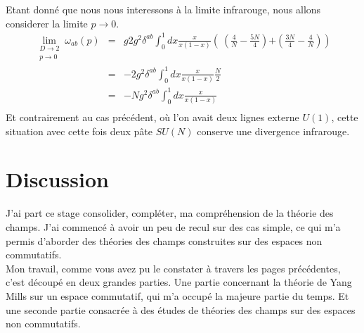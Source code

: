 \documentclass[a4paper,11pt]{article}
\theoremstyle{plain}
\theoremstyle{definition}
\theoremstyle{remark}
\numberwithin{equation}{section}
\numberwithin{equation}{subsection}
\numberwithin{figure}{section}
\begin{document}
Etant donné que nous nous interessons à la limite infrarouge, nous allons considerer la limite $p \to 0$.
 \begin{eqnarray}
 \lim\limits_{
\begin{array}{l}
D \to 2\\
p \to 0
\end{array}}  \omega_{ab}(p) &=& g2 g^{2}  \delta^{ab}
\int_{0}^{1}  dx \frac{x}{x(1-x)}
\left( \
\left( \frac{4}{N}  -  \frac{5N}{4}  \right)  \right. 
 \left.   + \left( \frac{3N}{4}  - \frac{4}{N}   \right) 
 \right)  \\
                                                     &=&  - 2 g^{2}  \delta^{ab}
\int_{0}^{1}  dx \frac{x}{x(1-x)}
\frac{N}{2} \\
                                                     &=&  - N g^{2}  \delta^{ab}
\int_{0}^{1}  dx \frac{x}{x(1-x)} \\
 \end{eqnarray}
Et contrairement au cas précédent, où l'on avait deux lignes externe $U(1)$, cette situation avec cette fois deux pâte $SU(N)$ 
conserve une divergence infrarouge.

\section{Discussion}

J'ai part ce stage consolider, compléter, ma compréhension de la théorie des champs. J'ai commencé à avoir un peu de recul sur des 
cas simple, ce qui m'a permis d'aborder des théories des champs construites sur des espaces non commutatifs.\\

Mon travail, comme vous avez pu le constater à travers les pages précédentes, c'est découpé en deux grandes parties. Une 
partie concernant la théorie de Yang Mills sur un espace commutatif, qui m'a occupé la majeure partie du temps. Et une seconde partie 
consacrée à des études de théories des champs sur des espaces non commutatifs.\\
\end{document}
